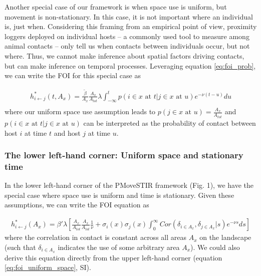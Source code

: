 \documentclass[letterpaper]{article}
\begin{document}
Another special case of our framework is when space use is uniform, but movement is non-stationary.  In this case, it is not important where an individual is, just when. Considering this framing from an empirical point of view, proximity loggers deployed on individual hosts -- a commonly used tool to measure among animal contacts -- only tell us when contacts between individuals occur, but not where.  Thus, we cannot make inference about spatial factors driving contacts, but can make inference on temporal processes. Leveraging equation \ref{eq:foi_prob}, we can write the FOI for this special case as

\begin{equation}
    \begin{aligned}
    h^*_{i \leftarrow j}(t, A_x) = \frac{\tilde{\beta}}{A_x}\frac{A_x}{A_{tot}} \lambda \int_{-\infty}^{t} p(i \in x \text{ at } t | j \in x \text{ at } u) e^{-\nu(t - u)} du \\
    \end{aligned}
    \label{eq:foi_uniform_space}
\end{equation}
where our uniform space use assumption leads to $p(j \in x \text{ at } u) = \frac{A_x}{A_{tot}}$ and $p(i \in x \text{ at } t | j \in x \text{ at } u)$ can be interpreted as the probability of contact between host $i$ at time $t$ and host $j$ at time $u$.  

\subsubsection*{The lower left-hand corner: Uniform space and stationary time}

In the lower left-hand corner of the PMoveSTIR framework (Fig. 1), we have the special case where space use is uniform and time is stationary. Given these assumptions, we can write the FOI equation as

\begin{equation}
    \begin{aligned}
        h^*_{i \leftarrow j}(A_x) = \beta' \lambda \left[\frac{A_x}{A_{tot}}\frac{A_x}{A_{tot}} \frac{1}{\nu} + \sigma_i(x) \sigma_j(x) \int_{0}^{\infty} Cor(\delta_{i \in A_x}, \delta_{j \in A_x} | s) e^{-\nu s} ds\right]
    \end{aligned}
    \label{eq:uniform_stationary1}
\end{equation}
where the correlation in contact is constant across all areas $A_x$ on the landscape (such that $\delta_{i \in A_x}$ indicates the use of some arbitrary area $A_x$).  We could also derive this equation directly from the upper left-hand corner (equation \ref{eq:foi_uniform_space}, SI).
\end{document}
